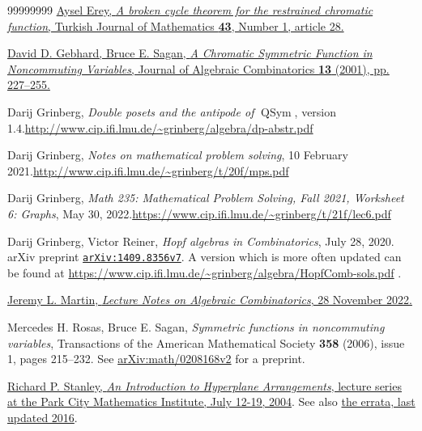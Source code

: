 \documentclass[numbers=enddot,12pt,final,onecolumn,notitlepage]{scrartcl}%
\theoremstyle{definition}
\begin{document}
\begin{thebibliography}{99999999}
\href{https://doi.org/10.3906/mat-1807-200}{Aysel
Erey, \textit{A broken cycle theorem for the restrained chromatic function},
Turkish Journal of Mathematics \textbf{43}, Number 1, article 28.}

%
\href{https://doi.org/10.1023/A:1011258714032}{David D. Gebhard, Bruce E.
Sagan, \textit{A Chromatic Symmetric Function in Noncommuting Variables},
Journal of Algebraic Combinatorics \textbf{13} (2001), pp. 227--255.}

Darij Grinberg, \textit{Double posets and the
antipode of }$\operatorname*{QSym}$, version 1.4.\newline\url{http://www.cip.ifi.lmu.de/~grinberg/algebra/dp-abstr.pdf}

Darij Grinberg, \textit{Notes on mathematical problem
solving}, 10 February 2021.\newline\url{http://www.cip.ifi.lmu.de/~grinberg/t/20f/mps.pdf}

Darij Grinberg, \textit{Math 235: Mathematical
Problem Solving, Fall 2021, Worksheet 6: Graphs}, May 30, 2022.\newline\url{https://www.cip.ifi.lmu.de/~grinberg/t/21f/lec6.pdf}

Darij Grinberg, Victor Reiner, \textit{Hopf algebras
in Combinatorics}, July 28, 2020. arXiv preprint
\href{http://www.arxiv.org/abs/1409.8356v7}{\texttt{arXiv:1409.8356v7}}.
\newline A version which is more often updated can be found at
\url{https://www.cip.ifi.lmu.de/~grinberg/algebra/HopfComb-sols.pdf} .

%
\href{https://jlmartin.ku.edu/LectureNotes.pdf}{Jeremy L. Martin,
\textit{Lecture Notes on Algebraic Combinatorics}, 28 November 2022.}

Mercedes H. Rosas, Bruce E. Sagan,
\textit{Symmetric functions in noncommuting variables}, Transactions of the
American Mathematical Society \textbf{358} (2006), issue 1, pages 215--232.
See \href{https://arxiv.org/abs/math/0208168v2}{arXiv:math/0208168v2} for a preprint.

%
\href{http://www-math.mit.edu/~rstan/arrangements/arr.html}{Richard P.
Stanley, \textit{An Introduction to Hyperplane Arrangements}, lecture series
at the Park City Mathematics Institute, July 12-19, 2004}. See also
\href{http://www-math.mit.edu/~rstan/arrangements/errata.pdf}{the errata, last
updated 2016}.


\end{thebibliography}
\end{document}
